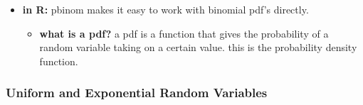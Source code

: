 \documentclass[
]{article}
\providecommand{\tightlist}{%
  \setlength{\itemsep}{0pt}\setlength{\parskip}{0pt}}
\begin{document}
\begin{itemize}
\begin{itemize}
\begin{itemize}
      \begin{itemize}
      \tightlist
      \item
        \textbf{in R:} pbinom makes it easy to work with binomial pdf's
        directly.

        \begin{itemize}
        \tightlist
        \item
          \textbf{what is a pdf?} a pdf is a function that gives the
          probability of a random variable taking on a certain value.
          this is the probability density function.
        \end{itemize}
      \end{itemize}
    \end{itemize}
  \end{itemize}
\end{itemize}

\hypertarget{uniform-and-exponential-random-variables}{%
\subsubsection{Uniform and Exponential Random
Variables}\label{uniform-and-exponential-random-variables}}
\end{document}
